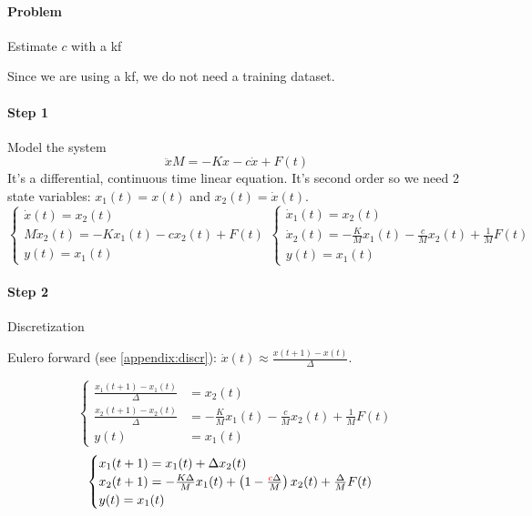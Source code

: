 \begin{example}
    \paragraph{Problem} Estimate $c$ with a \gls{kf}

    Since we are using a \gls{kf}, we do not need a training dataset.

    \paragraph{Step 1} Model the system
    \[
        \ddot{x}M = -Kx - c\dot{x} + F(t)
    \]
    It's a differential, continuous time linear equation.
    It's second order so we need 2 state variables: $x_1(t) = x(t)$ and $x_2(t) = \dot{x}(t)$.
    \[
        \begin{cases}
            \dot{x}(t) = x_2(t) \\
            M\dot{x}_2(t) = -Kx_1(t) -cx_2(t) + F(t) \\
            y(t) = x_1(t)
        \end{cases}
        \begin{cases}
            \dot{x}_1(t) = x_2(t) \\
            \dot{x}_2(t) = -\frac{K}{M} x_1(t) - \frac{c}{M} x_2(t) + \frac{1}{M}F(t) \\
            y(t) = x_1(t)
        \end{cases}
    \]

    \paragraph{Step 2} Discretization

    Eulero forward (see \ref{appendix:discr}): $\dot{x}(t) \approx \frac{x(t+1)-x(t)}{\Delta}$.

    \[
        \begin{cases}
            \frac{x_1(t+1)-x_1(t)}{\Delta} &= x_2(t) \\
            \frac{x_2(t+1)-x_2(t)}{\Delta} &= -\frac{K}{M} x_1(t) - \frac{c}{M} x_2(t) + \frac{1}{M}F(t) \\
            y(t) &= x_1(t)
        \end{cases}
    \]
    \[
        \begin{cases}
            x_1(t+1) = x_1(t) + \Delta x_2(t) \\
            x_2(t+1) = -\frac{K\Delta}{M}x_1(t) + \left(1-\frac{{\color{red}c}\Delta}{M}\right)x_2(t) + \frac{\Delta}{M}F(t) \\
            y(t) = x_1(t)
        \end{cases}
    \]


\end{example}
